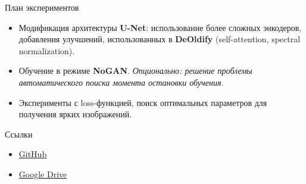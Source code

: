 \documentclass[aspectratio=169]{beamer}
\begin{document}
\begin{frame}{План экспериментов}
\begin{itemize}
    \item Модификация архитектуры \textbf{U-Net}: использование более сложных энкодеров, добавления улучшений, использованных в \textbf{DeOldify} (self-attention, spectral normalization).
    \item Обучение в режиме \textbf{NoGAN}. \textit{Опционально: решение проблемы автоматического поиска момента остановки обучения}.
    \item Эксперименты с loss-функцией, поиск оптимальных параметров для получения ярких изображений.
\end{itemize}
\end{frame}

\begin{frame}{Ссылки}
\begin{itemize}
    \item \href{https://github.com/vsgolovin/colorize/tree/Mailstone}{GitHub}
    \item \href{https://drive.google.com/drive/folders/1ebPVAsKlLlXY2Tg8Q1TXbiTRhfdegI40}{Google Drive}
\end{itemize}
\end{frame}
\end{document}
